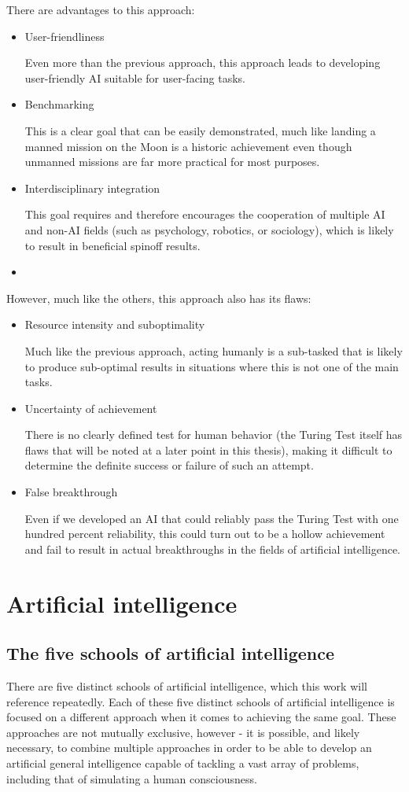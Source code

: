 \documentclass[masterthesis]{fer}
\begin{document}
There are advantages to this approach:
\begin{itemize}
\item{User-friendliness}

Even more than the previous approach, this approach leads to developing user-friendly AI suitable for user-facing tasks.
\item{Benchmarking}

This is a clear goal that can be easily demonstrated, much like landing a manned mission on the Moon is a historic achievement even though unmanned missions are far more practical for most purposes.
\item{Interdisciplinary integration}

This goal requires and therefore encourages the cooperation of multiple AI and non-AI fields (such as psychology, robotics, or sociology), which is likely to result in beneficial spinoff results.
\item
\end{itemize}
However, much like the others, this approach also has its flaws:
\begin{itemize}
\item{Resource intensity and suboptimality}

Much like the previous approach, acting humanly is a sub-tasked that is likely to produce sub-optimal results in situations where this is not one of the main tasks.
\item{Uncertainty of achievement}

There is no clearly defined test for human behavior (the Turing Test itself has flaws that will be noted at a later point in this thesis), making it difficult to determine the definite success or failure of such an attempt.
\item{False breakthrough}

Even if we developed an AI that could reliably pass the Turing Test with one hundred percent reliability, this could turn out to be a hollow achievement and fail to result in actual breakthroughs in the fields of artificial intelligence.
\end{itemize}
\section{Artificial intelligence}

\subsection{The five schools of artificial intelligence}
There are five distinct schools of artificial intelligence, which this work will reference repeatedly.
   Each of these five distinct schools of artificial intelligence is focused on a different approach when it comes to achieving the same goal. These approaches are not mutually exclusive, however - it is possible, and likely necessary, to combine multiple approaches in order to be able to develop an artificial general intelligence capable of tackling a vast array of problems, including that of simulating a human consciousness.
\end{document}

